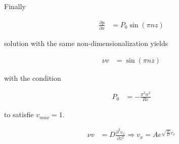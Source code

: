 Finally

\begin{align}
\frac{\partial p}{\partial x} &= P_0 \sin(\pi n z)
\end{align}

solution with the same non-dimensionalization yields

\begin{align}
 \nu v &=  \sin(\pi n z)
\end{align}

with the condition

\begin{align}
 P_0 &= -\frac{\pi^2n^2}{Re}
\end{align}

to satisfie $v_{max} = 1$.


\begin{align}
 \nu v &= D \frac{\partial^2 v_x}{\partial z^2}  \Rightarrow  v_x = A e^{\sqrt{\frac{\nu}{D}}v_x}
\end{align}
